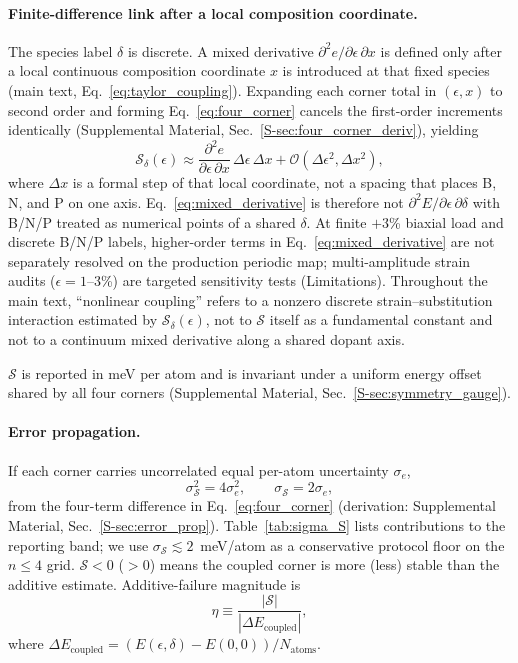 \paragraph{Finite-difference link after a local composition coordinate.}
The species label $\delta$ is discrete.
A mixed derivative $\partial^2 e/\partial\epsilon\,\partial x$ is defined only after a local continuous composition coordinate $x$ is introduced at that fixed species (main text, Eq.~\eqref{eq:taylor_coupling}).
Expanding each corner total in $(\epsilon,x)$ to second order and forming Eq.~\eqref{eq:four_corner} cancels the first-order increments identically (Supplemental Material, Sec.~\ref{S-sec:four_corner_deriv}), yielding
\begin{equation}
\mathcal{S}_\delta(\epsilon)\approx
\frac{\partial^2 e}{\partial\epsilon\,\partial x}\,
\Delta\epsilon\,\Delta x
+ \mathcal{O}(\Delta\epsilon^2,\Delta x^2),
\label{eq:mixed_derivative}
\end{equation}
where $\Delta x$ is a formal step of that local coordinate, not a spacing that places B, N, and P on one axis.
Eq.~\eqref{eq:mixed_derivative} is therefore not $\partial^2 E/\partial\epsilon\,\partial\delta$ with B/N/P treated as numerical points of a shared $\delta$.
At finite $+3$\% biaxial load and discrete B/N/P labels, higher-order terms in Eq.~\eqref{eq:mixed_derivative} are not separately resolved on the production periodic map; multi-amplitude strain audits ($\epsilon=1$--$3$\%) are targeted sensitivity tests (Limitations).
Throughout the main text, ``nonlinear coupling'' refers to a nonzero discrete strain--substitution interaction estimated by $\mathcal{S}_\delta(\epsilon)$, not to $\mathcal{S}$ itself as a fundamental constant and not to a continuum mixed derivative along a shared dopant axis.

$\mathcal{S}$ is reported in meV per atom and is invariant under a uniform energy offset shared by all four corners (Supplemental Material, Sec.~\ref{S-sec:symmetry_gauge}).

\paragraph{Error propagation.}
If each corner carries uncorrelated equal per-atom uncertainty $\sigma_e$,
\begin{equation}
\sigma_{\mathcal{S}}^2 = 4\sigma_e^2,
\qquad
\sigma_{\mathcal{S}} = 2\sigma_e,
\label{eq:sigma_propagation}
\end{equation}
from the four-term difference in Eq.~\eqref{eq:four_corner} (derivation: Supplemental Material, Sec.~\ref{S-sec:error_prop}).
Table~\ref{tab:sigma_S} lists contributions to the reporting band; we use $\sigma_{\mathcal{S}}\lesssim 2$~meV/atom as a conservative protocol floor on the $n\leq 4$ grid.
$\mathcal{S}<0$ ($>0$) means the coupled corner is more (less) stable than the additive estimate.
Additive-failure magnitude is
\begin{equation}
\eta \equiv \frac{|\mathcal{S}|}{|\Delta E_{\mathrm{coupled}}|},
\label{eq:additive_fraction}
\end{equation}
where $\Delta E_{\mathrm{coupled}}=(E(\epsilon,\delta)-E(0,0))/N_{\mathrm{atoms}}$.
